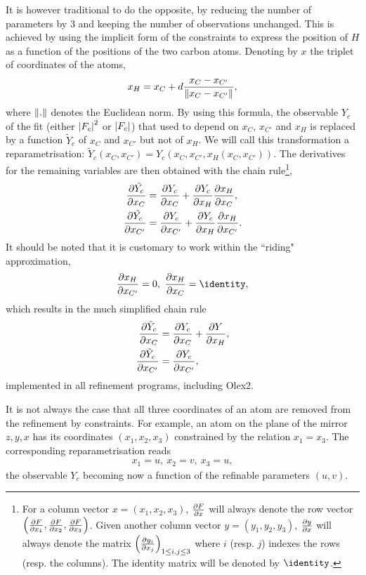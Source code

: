 \documentclass[pdf]{iucr}
\begin{document}
It is however traditional to do the opposite, by reducing the number of parameters by 3 and keeping the number of observations unchanged. This is achieved by using the implicit form of the constraints to express the position of $H$ as a function of the positions of the two carbon atoms. Denoting by $x$ the triplet of coordinates of the atoms,
\begin{equation}
x_H = x_C + d \frac{x_C - x_{C'}}{\| x_C - x_{C'} \|},
\end{equation} 
where $\| . \|$ denotes the Euclidean norm. By using this formula, the observable $Y_c$ of the fit (either $\left| F_c \right|^2$ or $\left| F_c \right|$) that used to depend on $x_C$, $x_{C'}$ and $x_H$ is replaced by a function $\tilde{Y}_c$ of $x_C$ and $x_{C'}$ but not of $x_H$. We will call this transformation a reparametrisation: $\tilde{Y}_c(x_C, x_{C'}) = Y_c(x_C, x_{C'}, x_H(x_C, x_{C'}))$. The derivatives for the remaining variables are then obtained with the chain rule\footnote{For a column vector $x=(x_1, x_2, x_3)$, $\frac{\partial F}{\partial x}$ will always denote the row vector $\left(\frac{\partial F}{\partial x_1}, \frac{\partial F}{\partial x_2}, \frac{\partial F}{\partial x_3}\right)$. Given another column vector $y=(y_1, y_2, y_3)$, $\frac{\partial y}{\partial x}$ will always denote the matrix $\left(\frac{\partial y_i}{\partial x_j}\right)_{1 \le i,j \le 3}$ where $i$ (resp. $j$) indexes the rows (resp. the columns). The identity matrix will be denoted by $\identity$.},
\begin{align}
\frac{\partial \tilde{Y_c}}{\partial x_C} &= \frac{\partial Y_c}{\partial x_C} + \frac{\partial Y_c}{\partial x_H} \frac{\partial x_H}{\partial x_C}, \\
\frac{\partial \tilde{Y_c}}{\partial x_{C'}} &= \frac{\partial Y_c}{\partial x_{C'}} + \frac{\partial Y_c}{\partial x_H} \frac{\partial x_H}{\partial x_{C'}}. \nonumber
\end{align}
It should be noted that it is customary to work within the ``riding" approximation,
\begin{align}
\partialder{x_H}{x_{C'}} = 0,\ \partialder{x_H}{x_C} = \identity,
\end{align} 
which results in the much simplified chain rule
\begin{align}
\frac{\partial \tilde{Y}_c}{\partial x_C} &= \frac{\partial Y_c}{\partial x_C} + \frac{\partial Y}{\partial x_H}, \\
\frac{\partial \tilde{Y}_c}{\partial x_{C'}} &= \frac{\partial Y_c}{\partial x_{C'}}, \nonumber
\end{align}
implemented in all refinement programs, including Olex2.

It is not always the case that all three coordinates of an atom are removed from the refinement by constraints. For example, an atom on the plane of the mirror $z,y,x$ has its coordinates $(x_1, x_2, x_3)$ constrained by the relation $x_1 = x_3$. The corresponding reparametrisation reads
\begin{align}
x_1 = u,\ x_2 = v,\ x_3 = u,
\label{eqn:specialposexamplereparam}
\end{align}
the observable $Y_c$ becoming now a function of the refinable parameters $(u,v)$.
\end{document}
